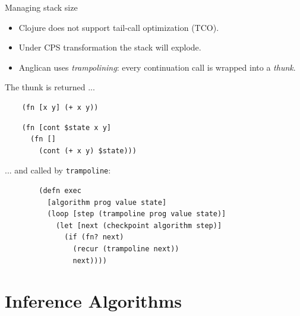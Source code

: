 \documentclass{beamer}
\begin{document}
\begin{frame}[fragile]{Managing stack size}
    \begin{itemize}
        \item Clojure does not support tail-call optimization (TCO).
        \item Under CPS transformation the stack will explode.
            \pause
        \item Anglican uses \textit{trampolining}: every continuation
            call is wrapped into a \textit{thunk}.
    \end{itemize}

    The thunk is returned ...

    \begin{minipage}{0.48\textwidth}
\begin{verbatim}
    (fn [x y] (+ x y))
\end{verbatim}
    \end{minipage}
    \begin{minipage}{0.48\textwidth}
        \vspace{0.5em}
\begin{verbatim}
    (fn [cont $state x y] 
      (fn []
        (cont (+ x y) $state)))
\end{verbatim}
      \vspace{0.5em}
    \end{minipage}

    ... and  called by \texttt{trampoline}:

\begin{verbatim}
        (defn exec
          [algorithm prog value state]
          (loop [step (trampoline prog value state)]
            (let [next (checkpoint algorithm step)]
              (if (fn? next)
                (recur (trampoline next))
                next))))
\end{verbatim}

\end{frame}

\section{Inference Algorithms}
\end{document}
